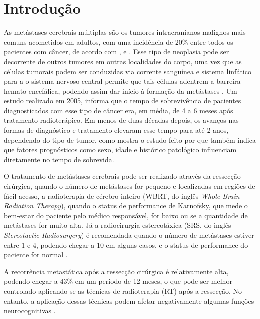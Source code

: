 %
%

\chapter{Introdução}\label{chap:introducao}

As metástases cerebrais múltiplas são os tumores intracranianos malignos mais comuns acometidos em adultos, com uma incidência de 20\% entre todos os pacientes com câncer, de acordo com \cite{Cho:2020}, \cite{Lin:2015} e \cite{Achrol:2019}. Esse tipo de neoplasia pode ser decorrente de outros tumores em outras localidades do corpo, uma vez que as células tumorais podem ser conduzidas via corrente sanguínea e sistema linfático para a o sistema nervoso central permite que tais células adentrem a barreira hemato encefálica, podendo assim dar início à formação da metástases \cite{Achrol:2019,Amsbaugh:2023}. Um estudo realizado em 2005, \cite{Shaw:2005} informa que o tempo de sobrevivência de pacientes diagnosticados com esse tipo de câncer era, em média, de 4 a 6 meses após tratamento radioterápico. Em menos de duas décadas depois, os avanços nas formas de diagnóstico e tratamento elevaram esse tempo para até 2 anos, dependendo do tipo de tumor, como mostra o estudo feito por \cite{Achrol:2019} que também indica que fatores prognósticos como sexo, idade e histórico patológico influenciam diretamente no tempo de sobrevida.

O tratamento de metástases cerebrais pode ser realizado através da ressecção cirúrgica, quando o número de metástases for pequeno e localizadas em regiões de fácil acesso, a radioterapia de cérebro inteiro (WBRT, do inglês \textit{Whole Brain Radiation Therapy}), quando o status de performance de Karnofsky, que mede o bem-estar do paciente pelo médico responsável, for baixo ou se a quantidade de metástases for muito alta. Já a radiocirurgia estereotáxica (SRS, do inglês \textit{Stereotactic Radiosurgery}) é recomendada quando o número de metástases estiver entre 1 e 4, podendo chegar a 10 em alguns casos, e o status de performance do paciente for normal \cite{Amsbaugh:2023}.

A recorrência metastática após a ressecção cirúrgica é relativamente alta, podendo chegar a 43\% em um período de 12 meses, o que pode ser melhor controlado aplicando-se as técnicas de radioterapia (RT) após a ressecção. No entanto, a aplicação dessas técnicas podem afetar negativamente algumas funções neurocognitivas \cite{Amsbaugh:2023}. 
 
